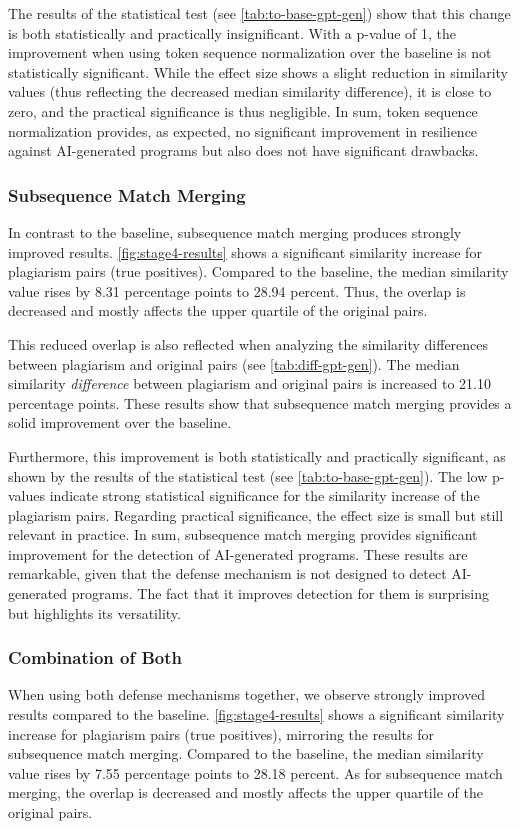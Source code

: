 The results of the statistical test (see \autoref{tab:to-base-gpt-gen}) show that this change is both statistically and practically insignificant.
With a p-value of 1, the improvement when using token sequence normalization over the baseline is not statistically significant.
While the effect size shows a slight reduction in similarity values (thus reflecting the decreased median similarity difference), it is close to zero, and the practical significance is thus negligible.
In sum, token sequence normalization provides, as expected, no significant improvement in resilience against AI-generated programs but also does not have significant drawbacks.

\subsubsection{Subsequence Match Merging}
In contrast to the baseline, subsequence match merging produces strongly improved results.
\autoref{fig:stage4-results} shows a significant similarity increase for plagiarism pairs (true positives).
Compared to the baseline, the median similarity value rises by 8.31 percentage points to 28.94 percent.
Thus, the overlap is decreased and mostly affects the upper quartile of the original pairs.

This reduced overlap is also reflected when analyzing the similarity differences between plagiarism and original pairs (see \autoref{tab:diff-gpt-gen}).
The median similarity \textit{difference} between plagiarism and original pairs is increased to 21.10 percentage points.
These results show that subsequence match merging provides a solid improvement over the baseline.

Furthermore, this improvement is both statistically and practically significant, as shown by the results of the statistical test (see \autoref{tab:to-base-gpt-gen}).
The low p-values indicate strong statistical significance for the similarity increase of the plagiarism pairs.
Regarding practical significance, the effect size is small but still relevant in practice.
In sum, subsequence match merging provides significant improvement for the detection of AI-generated programs.
These results are remarkable, given that the defense mechanism is not designed to detect AI-generated programs. The fact that it improves detection for them is surprising but highlights its versatility.

\subsubsection{Combination of Both}
When using both defense mechanisms together, we observe strongly improved results compared to the baseline.
\autoref{fig:stage4-results} shows a significant similarity increase for plagiarism pairs (true positives), mirroring the results for subsequence match merging.
Compared to the baseline, the median similarity value rises by 7.55 percentage points to 28.18 percent.
As for subsequence match merging, the overlap is decreased and mostly affects the upper quartile of the original pairs.

